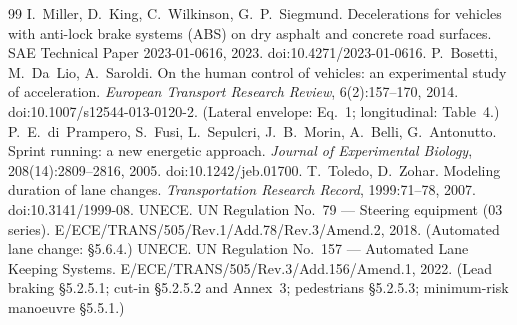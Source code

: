 \documentclass[11pt]{article}
\theoremstyle{definition}
\theoremstyle{remark}
\begin{document}
\begin{thebibliography}{99}
 I.~Miller, D.~King, C.~Wilkinson, G.~P.~Siegmund. Decelerations for vehicles with anti-lock brake systems (ABS) on dry asphalt and concrete road surfaces. SAE Technical Paper 2023-01-0616, 2023. doi:10.4271/2023-01-0616.
 P.~Bosetti, M.~Da~Lio, A.~Saroldi. On the human control of vehicles: an experimental study of acceleration. \emph{European Transport Research Review}, 6(2):157--170, 2014. doi:10.1007/s12544-013-0120-2. (Lateral envelope: Eq.~1; longitudinal: Table~4.)
 P.~E.~di~Prampero, S.~Fusi, L.~Sepulcri, J.~B.~Morin, A.~Belli, G.~Antonutto. Sprint running: a new energetic approach. \emph{Journal of Experimental Biology}, 208(14):2809--2816, 2005. doi:10.1242/jeb.01700.
 T.~Toledo, D.~Zohar. Modeling duration of lane changes. \emph{Transportation Research Record}, 1999:71--78, 2007. doi:10.3141/1999-08.
 UNECE. UN Regulation No.~79 --- Steering equipment (03 series). E/ECE/TRANS/505/Rev.1/Add.78/Rev.3/Amend.2, 2018. (Automated lane change: \S5.6.4.)
 UNECE. UN Regulation No.~157 --- Automated Lane Keeping Systems. E/ECE/TRANS/505/Rev.3/Add.156/Amend.1, 2022. (Lead braking \S5.2.5.1; cut-in \S5.2.5.2 and Annex~3; pedestrians \S5.2.5.3; minimum-risk manoeuvre \S5.5.1.)
\end{thebibliography}
\end{document}
